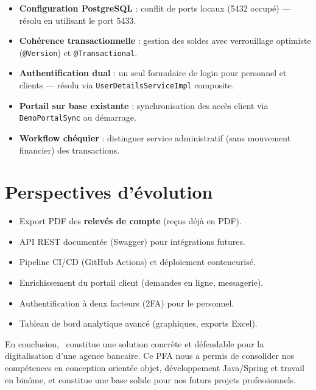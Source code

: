 \begin{itemize}[leftmargin=*]
    \item \textbf{Configuration PostgreSQL} : conflit de ports locaux (5432 occupé) — résolu en utilisant le port 5433.
    \item \textbf{Cohérence transactionnelle} : gestion des soldes avec verrouillage optimiste (\texttt{@Version}) et \texttt{@Transactional}.
    \item \textbf{Authentification dual} : un seul formulaire de login pour personnel et clients — résolu via \texttt{UserDetailsServiceImpl} composite.
    \item \textbf{Portail sur base existante} : synchronisation des accès client via \texttt{DemoPortalSync} au démarrage.
    \item \textbf{Workflow chéquier} : distinguer service administratif (sans mouvement financier) des transactions.
\end{itemize}

\section*{Perspectives d'évolution}

\begin{itemize}[leftmargin=*]
    \item Export PDF des \textbf{relevés de compte} (reçus déjà en PDF).
    \item API REST documentée (Swagger) pour intégrations futures.
    \item Pipeline CI/CD (GitHub Actions) et déploiement conteneurisé.
    \item Enrichissement du portail client (demandes en ligne, messagerie).
    \item Authentification à deux facteurs (2FA) pour le personnel.
    \item Tableau de bord analytique avancé (graphiques, exports Excel).
\end{itemize}

\vspace{0.5cm}
En conclusion, \nomapplication\ constitue une solution concrète et défendable pour la digitalisation d'une agence bancaire. Ce PFA nous a permis de consolider nos compétences en conception orientée objet, développement Java/Spring et travail en binôme, et constitue une base solide pour nos futurs projets professionnels.

\vspace{1cm}
\begin{flushright}
    \etudianteun\\
    \etudiantedeux
\end{flushright}
